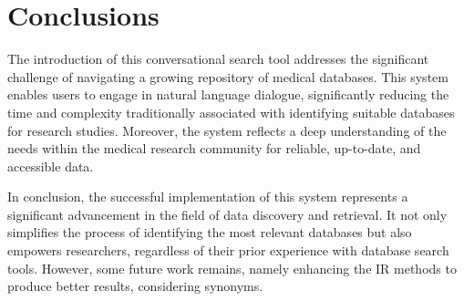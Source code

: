 \chapter{Conclusions}
\label{chapter:Conclusions}



The introduction of this conversational search tool addresses the significant challenge of navigating a growing repository of medical databases. This system enables users to engage in natural language dialogue, significantly reducing the time and complexity traditionally associated with identifying suitable databases for research studies. Moreover, the system reflects a deep understanding of the needs within the medical research community for reliable, up-to-date, and accessible data.

In conclusion, the successful implementation of this system represents a significant advancement in the field of data discovery and retrieval. It not only simplifies the process of identifying the most relevant databases but also empowers researchers, regardless of their prior experience with database search tools. However, some future work remains, namely enhancing the IR methods to produce better results, considering synonyms.